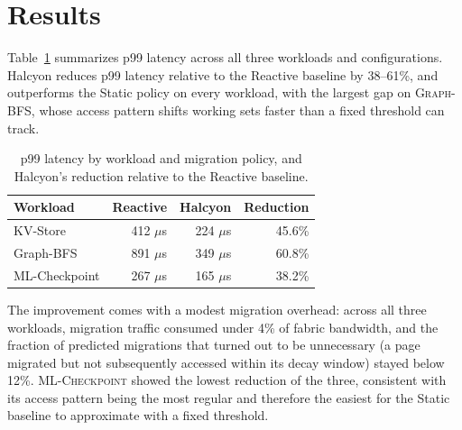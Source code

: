 \section{Results}
Table~\ref{tab:results} summarizes p99 latency across all three workloads and configurations. Halcyon reduces p99 latency relative to the Reactive baseline by 38--61\%, and outperforms the Static policy on every workload, with the largest gap on \textsc{Graph-BFS}, whose access pattern shifts working sets faster than a fixed threshold can track.

\begin{table}[t]
\centering
\caption{p99 latency by workload and migration policy, and Halcyon's reduction relative to the Reactive baseline.}
\label{tab:results}
\begin{tabular}{@{}lrrr@{}}
\toprule
\rowcolor{osdilight}
Workload & Reactive & Halcyon & Reduction \\
\midrule
KV-Store      & 412 $\mu$s & 224 $\mu$s & 45.6\% \\
Graph-BFS     & 891 $\mu$s & 349 $\mu$s & 60.8\% \\
ML-Checkpoint & 267 $\mu$s & 165 $\mu$s & 38.2\% \\
\bottomrule
\end{tabular}
\end{table}

The improvement comes with a modest migration overhead: across all three workloads, migration traffic consumed under 4\% of fabric bandwidth, and the fraction of predicted migrations that turned out to be unnecessary (a page migrated but not subsequently accessed within its decay window) stayed below 12\%. \textsc{ML-Checkpoint} showed the lowest reduction of the three, consistent with its access pattern being the most regular and therefore the easiest for the Static baseline to approximate with a fixed threshold.
